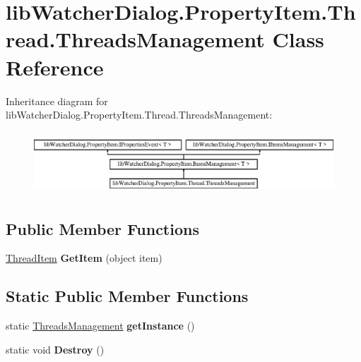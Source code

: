 \hypertarget{classlib_watcher_dialog_1_1_property_item_1_1_thread_1_1_threads_management}{\section{lib\+Watcher\+Dialog.\+Property\+Item.\+Thread.\+Threads\+Management Class Reference}
\label{classlib_watcher_dialog_1_1_property_item_1_1_thread_1_1_threads_management}
}
Inheritance diagram for lib\+Watcher\+Dialog.\+Property\+Item.\+Thread.\+Threads\+Management\+:\begin{figure}[H]
\begin{center}
\leavevmode
\includegraphics[height=2.352941cm]{classlib_watcher_dialog_1_1_property_item_1_1_thread_1_1_threads_management}
\end{center}
\end{figure}
\subsection*{Public Member Functions}
\begin{DoxyCompactItemize}
\item 
\hypertarget{classlib_watcher_dialog_1_1_property_item_1_1_thread_1_1_threads_management_a38cf3fac9a86f8041eb2e3db25d9a270}{\hyperlink{classlib_watcher_dialog_1_1_property_item_1_1_thread_1_1_thread_item}{Thread\+Item} {\bfseries Get\+Item} (object item)}\label{classlib_watcher_dialog_1_1_property_item_1_1_thread_1_1_threads_management_a38cf3fac9a86f8041eb2e3db25d9a270}

\end{DoxyCompactItemize}
\subsection*{Static Public Member Functions}
\begin{DoxyCompactItemize}
\item 
\hypertarget{classlib_watcher_dialog_1_1_property_item_1_1_thread_1_1_threads_management_a4ee891efe9290437e3252aeac74b2f05}{static \hyperlink{classlib_watcher_dialog_1_1_property_item_1_1_thread_1_1_threads_management}{Threads\+Management} {\bfseries get\+Instance} ()}\label{classlib_watcher_dialog_1_1_property_item_1_1_thread_1_1_threads_management_a4ee891efe9290437e3252aeac74b2f05}

\item 
\hypertarget{classlib_watcher_dialog_1_1_property_item_1_1_thread_1_1_threads_management_a1f210ff88bf5cc337f509b052da6a913}{static void {\bfseries Destroy} ()}\label{classlib_watcher_dialog_1_1_property_item_1_1_thread_1_1_threads_management_a1f210ff88bf5cc337f509b052da6a913}

\end{DoxyCompactItemize}
